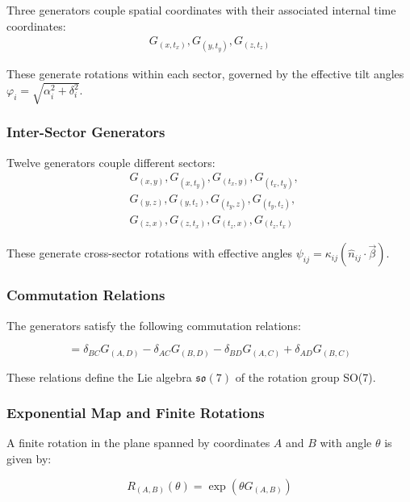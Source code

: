 \documentclass{article}
\begin{document}
Three generators couple spatial coordinates with their associated internal time coordinates:
\begin{align}
G_{(x,t_x)}, G_{(y,t_y)}, G_{(z,t_z)}
\end{align}

These generate rotations within each sector, governed by the effective tilt angles $\varphi_i = \sqrt{\alpha_i^2 + \delta_i^2}$.

\subsubsection*{Inter-Sector Generators}

Twelve generators couple different sectors:
\begin{align}
&G_{(x,y)}, G_{(x,t_y)}, G_{(t_x,y)}, G_{(t_x,t_y)}, \\
&G_{(y,z)}, G_{(y,t_z)}, G_{(t_y,z)}, G_{(t_y,t_z)}, \\
&G_{(z,x)}, G_{(z,t_x)}, G_{(t_z,x)}, G_{(t_z,t_x)}
\end{align}

These generate cross-sector rotations with effective angles $\psi_{ij} = \kappa_{ij}(\hat{n}_{ij} \cdot \vec{\beta})$.

\subsubsection{Commutation Relations}

The generators satisfy the following commutation relations:

\begin{equation}
[G_{(A,B)}, G_{(C,D)}] = \delta_{BC}G_{(A,D)} - \delta_{AC}G_{(B,D)} - \delta_{BD}G_{(A,C)} + \delta_{AD}G_{(B,C)}
\end{equation}

These relations define the Lie algebra $\mathfrak{so}(7)$ of the rotation group SO(7).

\subsubsection{Exponential Map and Finite Rotations}

A finite rotation in the plane spanned by coordinates $A$ and $B$ with angle $\theta$ is given by:

\begin{equation}
R_{(A,B)}(\theta) = \exp(\theta G_{(A,B)})
\end{equation}
\end{document}
